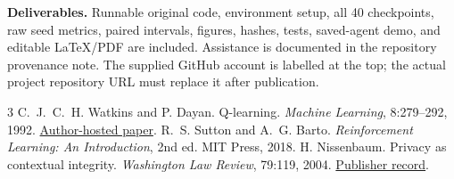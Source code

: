 \documentclass[10pt,a4paper,twocolumn]{article}
\begin{document}
\textbf{Deliverables.} Runnable original code, environment setup, all 40 checkpoints, raw seed metrics, paired intervals, figures, hashes, tests, saved-agent demo, and editable LaTeX/PDF are included. Assistance is documented in the repository provenance note. The supplied GitHub account is labelled at the top; the actual project repository URL must replace it after publication.

\vspace{-3pt}
\begin{thebibliography}{3}\setlength{\itemsep}{-1pt}\footnotesize
{} C.~J.~C.~H. Watkins and P. Dayan. Q-learning. \emph{Machine Learning}, 8:279--292, 1992. \href{https://www.gatsby.ucl.ac.uk/~dayan/papers/cjch.pdf}{Author-hosted paper}.
 R.~S. Sutton and A.~G. Barto. \emph{Reinforcement Learning: An Introduction}, 2nd ed. MIT Press, 2018.
 H. Nissenbaum. Privacy as contextual integrity. \emph{Washington Law Review}, 79:119, 2004. \href{https://digitalcommons.law.uw.edu/wlr/vol79/iss1/10/}{Publisher record}.
\end{thebibliography}
\end{document}

